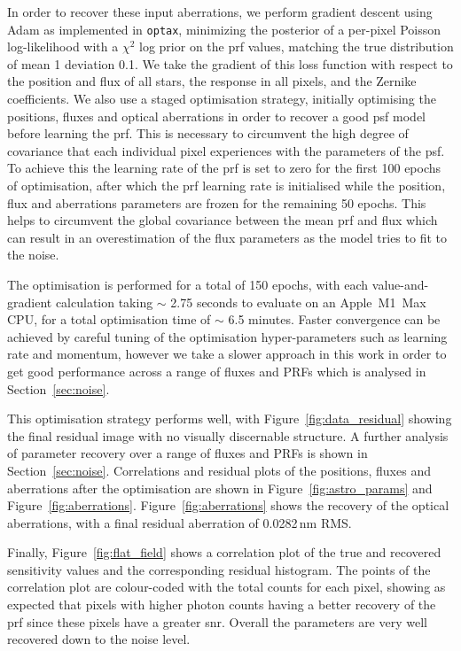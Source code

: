 \documentclass[]{spieman}
\newcommand\optax{\texttt{optax}\xspace}
\begin{document}
In order to recover these input aberrations, we perform gradient descent using Adam \cite{Kingma2014} as implemented in \optax \cite{optax2020github}, minimizing the posterior of a per-pixel Poisson log-likelihood with a $\chi^2$ log prior on the \ac{prf} values, matching the true distribution of mean 1 deviation 0.1. We take the gradient of this loss function with respect to the position and flux of all stars, the response in all pixels, and the Zernike coefficients. We also use a staged optimisation strategy, initially optimising the positions, fluxes and optical aberrations in order to recover a good \ac{psf} model before learning the \ac{prf}. This is necessary to circumvent the high degree of covariance that each individual pixel experiences with the parameters of the \ac{psf}. To achieve this the learning rate of the \ac{prf} is set to zero for the first 100 epochs of optimisation, after which the \ac{prf} learning rate is initialised while the position, flux and aberrations parameters are frozen for the remaining 50 epochs. This helps to circumvent the global covariance between the mean \ac{prf} and flux which can result in an overestimation of the flux parameters as the model tries to fit to the noise.

The optimisation is performed for a total of 150 epochs, with each value-and-gradient calculation taking $\sim$ 2.75 seconds to evaluate on an Apple~M1~Max CPU, for a total optimisation time of $\sim$ 6.5 minutes. Faster convergence can be achieved by careful tuning of the optimisation hyper-parameters such as learning rate and momentum, however we take a slower approach in this work in order to get good performance across a range of fluxes and PRFs which is analysed in Section~\ref{sec:noise}.

This optimisation strategy performs well, with Figure~\ref{fig:data_residual} showing the final residual image with no visually discernable structure. A further analysis of parameter recovery over a range of fluxes and PRFs is shown in Section~\ref{sec:noise}. Correlations and residual plots of the positions, fluxes and aberrations after the optimisation are shown in Figure~\ref{fig:astro_params} and Figure~\ref{fig:aberrations}. Figure~\ref{fig:aberrations} shows the recovery of the optical aberrations, with a final residual aberration of 0.0282\,nm RMS.

Finally, Figure~\ref{fig:flat_field} shows a correlation plot of the true and recovered sensitivity values and the corresponding residual histogram. The points of the correlation plot are colour-coded with the total counts for each pixel, showing as expected that pixels with higher photon counts having a better recovery of the \ac{prf} since these pixels have a greater \ac{snr}. Overall the parameters are very well recovered down to the noise level.
\end{document}

